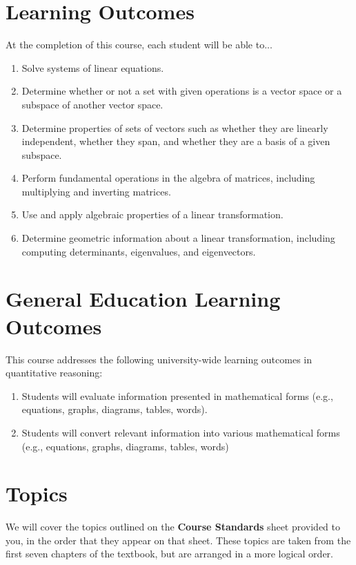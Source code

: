 \documentclass{article}
\begin{document}
\section*{\fontsize{12}{15}\selectfont Learning Outcomes}
At the completion of this course, each student will be able to...
\begin{enumerate}[1)]
\item Solve systems of linear equations.
\item Determine whether or not a set with given operations is a vector space or a subspace of another vector space.
\item Determine properties of sets of vectors such as whether they are linearly independent, whether they span, and whether they are a basis of a given subspace.
\item Perform fundamental operations in the algebra of matrices, including multiplying and inverting matrices.
\item Use and apply algebraic properties of a linear transformation.
\item Determine geometric information about a linear transformation, including computing determinants, eigenvalues, and eigenvectors.
\end{enumerate}

\section*{\fontsize{12}{15}\selectfont General Education Learning Outcomes}
This course addresses the following university-wide learning outcomes in quantitative reasoning:
\begin{enumerate}[1)]
\item Students will evaluate information presented in mathematical forms (e.g., equations, graphs, diagrams, tables, words).
\item Students will convert relevant information into various mathematical forms (e.g., equations, graphs, diagrams, tables, words)
\end{enumerate}


\section*{\fontsize{12}{15}\selectfont Topics}
We will cover the topics outlined on the \textbf{Course Standards}
sheet provided to you, in the order that they appear on that sheet.
These topics are taken from the first seven chapters of the textbook,
but are arranged in a more logical order.
\end{document}
